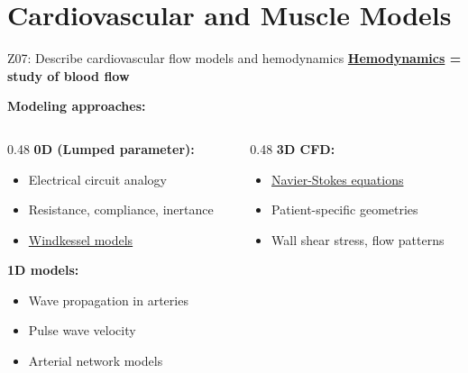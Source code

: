 \documentclass[aspectratio=169, 10pt]{beamer}
\begin{document}
\section{Cardiovascular and Muscle Models}

\begin{frame}{Z07: Describe cardiovascular flow models and hemodynamics}
    \textbf{\href{https://en.wikipedia.org/wiki/Hemodynamics}{Hemodynamics} = study of blood flow}
    
    \vspace{0.2cm}
    \textbf{Modeling approaches:}
    \begin{columns}[T]
        \begin{column}{0.48\textwidth}
            \textbf{0D (Lumped parameter):}
            \begin{itemize}
                \item Electrical circuit analogy
                \item Resistance, compliance, inertance
                \item \href{https://en.wikipedia.org/wiki/Windkessel_effect}{Windkessel models}
            \end{itemize}
            
            \vspace{0.2cm}
            \textbf{1D models:}
            \begin{itemize}
                \item Wave propagation in arteries
                \item Pulse wave velocity
                \item Arterial network models
            \end{itemize}
        \end{column}
        \begin{column}{0.48\textwidth}
            \textbf{3D CFD:}
            \begin{itemize}
                \item \href{https://en.wikipedia.org/wiki/Navier\%E2\%80\%93Stokes_equations}{Navier-Stokes equations}
                \item Patient-specific geometries
                \item Wall shear stress, flow patterns
            \end{itemize}
            

\end{column}
\end{columns}
\end{frame}
\end{document}
